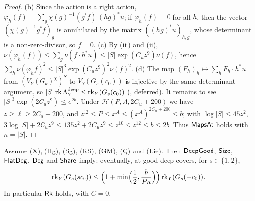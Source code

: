 \begin{proof}
(b) Since the action is a right action, $\varphi_h(f)=\sum_g\chi(g)^{-1}(g^*f)\,(hg)^*u$; if $\varphi_h(f)=0$ for all $h$,
then the vector $(\chi(g)^{-1}g^*f)_g$ is annihilated by the matrix $((hg)^*u)_{h,g}$, whose determinant is a
non-zero-divisor, so $f=0$. (c) By (iii) and (ii), $\nu(\varphi_h(f))\le\sum_g\nu(f\cdot h^*u)\le|S|\exp(C_uz^9)\nu(f)$,
hence $\sum_h\nu(\varphi_hf)^2\le|S|^3\exp(C_uz^9)^2\nu(f)^2$. (d) The map $(F_h)_h\mapsto\sum_hF_h\cdot h^*u$ from
$(V_Y(G_k)^\chi)^S$ to $V_Y(G_s(c_0))$ is injective by the same determinant argument, so
$|S|\operatorname{rk}\Lambda^{\mathrm{deep}}_Y\le\operatorname{rk}_Y(G_s(c_0))$ (,
deferred). It remains to see $|S|^3\exp(2C_uz^9)\le e^{2b}$. Under $\mathcal H(P,A,2C_u+200)$ we have
$z\ge\ell\ge2C_u+200$, and $z^{12}\le P\le x^A\le(x^A)^{2C_u+200}\le b$; with $\log|S|\le45z^2$,
$3\log|S|+2C_uz^9\le135z^2+2C_uz^9\le z^{10}\le z^{12}\le b\le2b$. Thus $\mathsf{MapsAt}$ holds with $n=|S|$.
\end{proof}

\begin{proposition}\label{pf:lift2:rank}
Assume \textup{(X)}, \textup{(Hg)}, \textup{(Sg)}, \textup{(KS)}, \textup{(GM)}, \textup{(Q)} and \textup{(Lie)}. Then $\mathsf{DeepGood}$, $\mathsf{Size}$, $\mathsf{FlatDeg}$,
$\mathsf{Deg}$ and $\mathsf{Share}$ imply: eventually, at good deep covers, for $s\in\{1,2\}$,
\[
\operatorname{rk}_Y(G_s(sc_0))\le\Bigl(1+\min\Bigl(\frac12,\frac b{P\kappa}\Bigr)\Bigr)\operatorname{rk}_Y(G_s(-c_0)).
\]
In particular $\mathsf{Rk}$ holds, with $C=0$.
\end{proposition}

